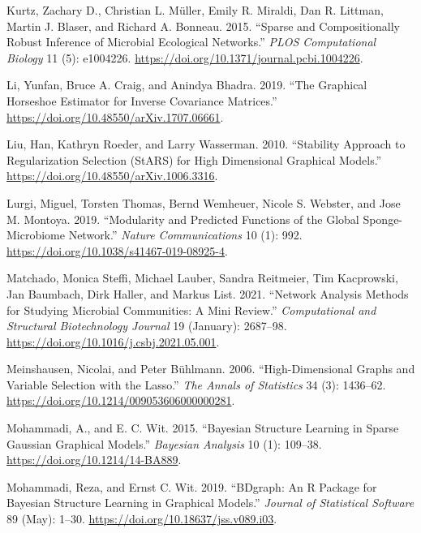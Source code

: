 \documentclass[
  a4paper,
]{article}
\newlength{\cslhangindent}
\newlength{\cslentryspacingunit} %
\newenvironment{CSLReferences}[2] %
 {%
  \setlength{\parindent}{0pt}
  \ifodd #1
  \let\oldpar\par
  \def\par{\hangindent=\cslhangindent\oldpar}
  \fi
  \setlength{\parskip}{#2\cslentryspacingunit}
 }%
 {}
\begin{document}
\begin{CSLReferences}{1}{0}
\leavevmode{}%
Kurtz, Zachary D., Christian L. Müller, Emily R. Miraldi, Dan R.
Littman, Martin J. Blaser, and Richard A. Bonneau. 2015. {``Sparse and
Compositionally Robust Inference of Microbial Ecological Networks.''}
\emph{PLOS Computational Biology} 11 (5): e1004226.
\url{https://doi.org/10.1371/journal.pcbi.1004226}.

\leavevmode{}%
Li, Yunfan, Bruce A. Craig, and Anindya Bhadra. 2019. {``The Graphical
Horseshoe Estimator for Inverse Covariance Matrices.''}
\url{https://doi.org/10.48550/arXiv.1707.06661}.

\leavevmode{}%
Liu, Han, Kathryn Roeder, and Larry Wasserman. 2010. {``Stability
Approach to Regularization Selection (StARS) for High Dimensional
Graphical Models.''} \url{https://doi.org/10.48550/arXiv.1006.3316}.

\leavevmode{}%
Lurgi, Miguel, Torsten Thomas, Bernd Wemheuer, Nicole S. Webster, and
Jose M. Montoya. 2019. {``Modularity and Predicted Functions of the
Global Sponge-Microbiome Network.''} \emph{Nature Communications} 10
(1): 992. \url{https://doi.org/10.1038/s41467-019-08925-4}.

\leavevmode{}%
Matchado, Monica Steffi, Michael Lauber, Sandra Reitmeier, Tim
Kacprowski, Jan Baumbach, Dirk Haller, and Markus List. 2021. {``Network
Analysis Methods for Studying Microbial Communities: A Mini Review.''}
\emph{Computational and Structural Biotechnology Journal} 19 (January):
2687--98. \url{https://doi.org/10.1016/j.csbj.2021.05.001}.

\leavevmode{}%
Meinshausen, Nicolai, and Peter Bühlmann. 2006. {``High-Dimensional
Graphs and Variable Selection with the Lasso.''} \emph{The Annals of
Statistics} 34 (3): 1436--62.
\url{https://doi.org/10.1214/009053606000000281}.

\leavevmode{}%
Mohammadi, A., and E. C. Wit. 2015. {``Bayesian Structure Learning in
Sparse Gaussian Graphical Models.''} \emph{Bayesian Analysis} 10 (1):
109--38. \url{https://doi.org/10.1214/14-BA889}.

\leavevmode{}%
Mohammadi, Reza, and Ernst C. Wit. 2019. {``BDgraph: An R Package for
Bayesian Structure Learning in Graphical Models.''} \emph{Journal of
Statistical Software} 89 (May): 1--30.
\url{https://doi.org/10.18637/jss.v089.i03}.


\end{CSLReferences}
\end{document}
